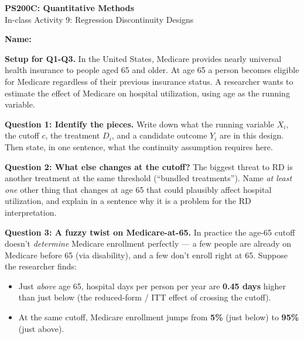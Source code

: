 \documentclass[11pt]{article}
\begin{document}
\begin{center}
{\Large \textbf{PS200C: Quantitative Methods}} \\[6pt]
{\large In-class Activity 9: Regression Discontinuity Designs}
\end{center}

\vspace{4pt}
\noindent\textbf{Name:} \hrulefill

\vspace{12pt}

\begin{framed}
\noindent\textbf{Setup for Q1-Q3.}  In the United States, Medicare provides nearly universal health insurance to people aged 65 and older.  At age 65 a person becomes eligible for Medicare regardless of their previous insurance status.  A researcher wants to estimate the effect of Medicare on hospital utilization, using age as the running variable.
\end{framed}

\vspace{6pt}

\noindent\textbf{Question 1: Identify the pieces.}  Write down what the running variable $X_i$, the cutoff $c$, the treatment $D_i$, and a candidate outcome $Y_i$ are in this design.  Then state, in one sentence, what the continuity assumption requires here.

\vspace{6cm}

\noindent\textbf{Question 2: What else changes at the cutoff?}  The biggest threat to RD is another treatment at the same threshold (``bundled treatments'').  Name \emph{at least one} other thing that changes at age 65 that could plausibly affect hospital utilization, and explain in a sentence why it is a problem for the RD interpretation.

\vspace{6cm}

\newpage

\noindent\textbf{Question 3: A fuzzy twist on Medicare-at-65.}  In practice the age-65 cutoff doesn't \emph{determine} Medicare enrollment perfectly --- a few people are already on Medicare before 65 (via disability), and a few don't enroll right at 65.  Suppose the researcher finds:

\medskip
\begin{itemize}[itemsep=0.2em, topsep=2pt]
\item Just \emph{above} age 65, hospital days per person per year are \textbf{0.45 days} higher than just below (the reduced-form / ITT effect of crossing the cutoff).
\item At the same cutoff, Medicare enrollment jumps from \textbf{5\%} (just below) to \textbf{95\%} (just above).
\end{itemize}
\end{document}
